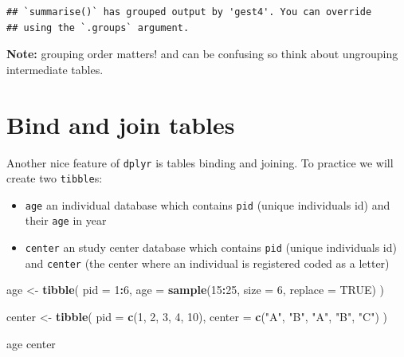 \documentclass[
]{book}
\newenvironment{Shaded}{\begin{snugshade}}{\end{snugshade}}
\newcommand{\AttributeTok}[1]{\textcolor[rgb]{0.13,0.29,0.53}{#1}}
\newcommand{\ConstantTok}[1]{\textcolor[rgb]{0.56,0.35,0.01}{#1}}
\newcommand{\DecValTok}[1]{\textcolor[rgb]{0.00,0.00,0.81}{#1}}
\newcommand{\FunctionTok}[1]{\textcolor[rgb]{0.13,0.29,0.53}{\textbf{#1}}}
\newcommand{\NormalTok}[1]{#1}
\newcommand{\OtherTok}[1]{\textcolor[rgb]{0.56,0.35,0.01}{#1}}
\newcommand{\SpecialCharTok}[1]{\textcolor[rgb]{0.81,0.36,0.00}{\textbf{#1}}}
\newcommand{\StringTok}[1]{\textcolor[rgb]{0.31,0.60,0.02}{#1}}
\providecommand{\tightlist}{%
  \setlength{\itemsep}{0pt}\setlength{\parskip}{0pt}}
\begin{document}
\begin{verbatim}
## `summarise()` has grouped output by 'gest4'. You can override
## using the `.groups` argument.
\end{verbatim}

\textbf{Note:} grouping order matters! and can be confusing so think about ungrouping intermediate tables.

\section{Bind and join tables}\label{bind-and-join-tables}

Another nice feature of \texttt{dplyr} is tables binding and joining. To practice we will create two \texttt{tibble}s:

\begin{itemize}
\tightlist
\item
  \texttt{age} an individual database which contains \texttt{pid} (unique individuals id)
  and their \texttt{age} in year
\item
  \texttt{center} an study center database which contains \texttt{pid} (unique individuals id)
  and \texttt{center} (the center where an individual is registered coded as a letter)
\end{itemize}

\begin{Shaded}
\begin{Highlighting}[]
\NormalTok{age }\OtherTok{\textless{}{-}}
  \FunctionTok{tibble}\NormalTok{(}
    \AttributeTok{pid =} \DecValTok{1}\SpecialCharTok{:}\DecValTok{6}\NormalTok{,}
    \AttributeTok{age =} \FunctionTok{sample}\NormalTok{(}\DecValTok{15}\SpecialCharTok{:}\DecValTok{25}\NormalTok{, }\AttributeTok{size =} \DecValTok{6}\NormalTok{, }\AttributeTok{replace =} \ConstantTok{TRUE}\NormalTok{)}
\NormalTok{  )}

\NormalTok{center }\OtherTok{\textless{}{-}}
  \FunctionTok{tibble}\NormalTok{(}
    \AttributeTok{pid =} \FunctionTok{c}\NormalTok{(}\DecValTok{1}\NormalTok{, }\DecValTok{2}\NormalTok{, }\DecValTok{3}\NormalTok{, }\DecValTok{4}\NormalTok{, }\DecValTok{10}\NormalTok{),}
    \AttributeTok{center =} \FunctionTok{c}\NormalTok{(}\StringTok{"A"}\NormalTok{, }\StringTok{"B"}\NormalTok{, }\StringTok{"A"}\NormalTok{, }\StringTok{"B"}\NormalTok{, }\StringTok{"C"}\NormalTok{)}
\NormalTok{  )}

\NormalTok{age}
\NormalTok{center}
\end{Highlighting}
\end{Shaded}
\end{document}
